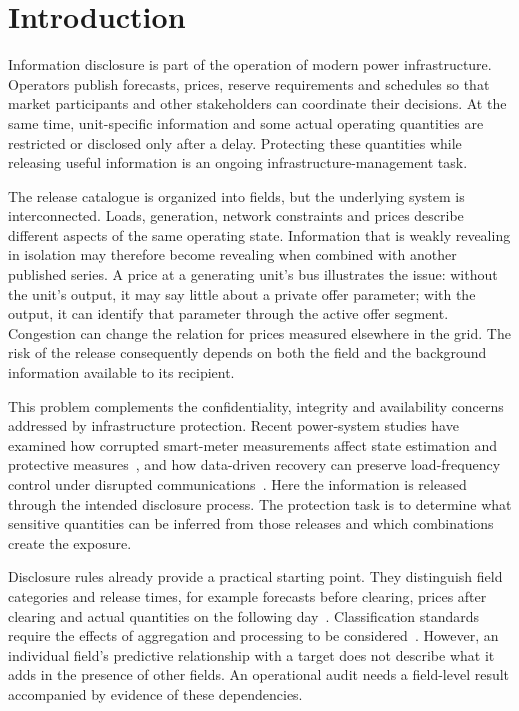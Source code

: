 \section{Introduction}\label{sec:intro}
Information disclosure is part of the operation of modern power infrastructure. Operators publish forecasts, prices, reserve requirements and schedules so that market participants and other stakeholders can coordinate their decisions. At the same time, unit-specific information and some actual operating quantities are restricted or disclosed only after a delay. Protecting these quantities while releasing useful information is an ongoing infrastructure-management task.

The release catalogue is organized into fields, but the underlying system is interconnected. Loads, generation, network constraints and prices describe different aspects of the same operating state. Information that is weakly revealing in isolation may therefore become revealing when combined with another published series. A price at a generating unit's bus illustrates the issue: without the unit's output, it may say little about a private offer parameter; with the output, it can identify that parameter through the active offer segment. Congestion can change the relation for prices measured elsewhere in the grid. The risk of the release consequently depends on both the field and the background information available to its recipient.

This problem complements the confidentiality, integrity and availability concerns addressed by infrastructure protection. Recent power-system studies have examined how corrupted smart-meter measurements affect state estimation and protective measures~\cite{farooq2024grid}, and how data-driven recovery can preserve load-frequency control under disrupted communications~\cite{syrmakesis2024darlfc}. Here the information is released through the intended disclosure process. The protection task is to determine what sensitive quantities can be inferred from those releases and which combinations create the exposure.

Disclosure rules already provide a practical starting point. They distinguish field categories and release times, for example forecasts before clearing, prices after clearing and actual quantities on the following day~\cite{nea2024disclosure}. Classification standards require the effects of aggregation and processing to be considered~\cite{gbt43697}. However, an individual field's predictive relationship with a target does not describe what it adds in the presence of other fields. An operational audit needs a field-level result accompanied by evidence of these dependencies.

